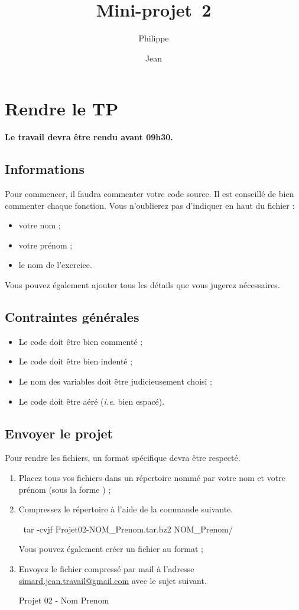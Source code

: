 \documentclass[a4paper]{article}
\title{Mini-projet~2}
\author{Philippe \Nom{Rinaudo}\and{}Jean \Nom{Simard}}
\date{\Date[l]{27}{10}{2009}}
\begin{document}
	\maketitle
	\section{Rendre le TP}
		\textbf{Le travail devra être rendu  avant 09h30.}
		\subsection{Informations}
			Pour commencer, il faudra commenter votre code source.
			Il est conseillé de bien commenter chaque fonction.
			Vous n'oublierez pas d'indiquer en haut du fichier :
			\begin{itemize}
				\item votre nom ;
				\item votre prénom ;
				\item le nom de l'exercice.
			\end{itemize}
			Vous pouvez également ajouter tous les détails que vous jugerez nécessaires.

		\subsection{Contraintes générales}
			\begin{itemize}
				\item Le code doit être bien commenté ;
				\item Le code doit être bien indenté ;
				\item Le nom des variables doit être judicieusement choisi ;
				\item Le code doit être aéré (\emph{i.e.} bien espacé).
			\end{itemize}

		\subsection{Envoyer le projet}
			Pour rendre les fichiers, un format spécifique devra être respecté.
			\begin{enumerate}
				\item Placez tous vos fichiers dans un répertoire nommé par votre nom et votre prénom (sous la forme ) ;
				\item Compressez le répertoire à l'aide de la commande suivante.
				\begin{Code*}
$~$ tar -cvjf Projet02-NOM_Prenom.tar.bz2 NOM_Prenom/
				\end{Code*}
				Vous pouvez également créer un fichier au format  ;
				\item Envoyez le fichier compressé  par mail à l'adresse \href{mailto:simard.jean.travail@gmail.com}{simard.jean.travail@gmail.com} avec le sujet suivant.
				\begin{Code*}
[CCI] Projet 02 - Nom Prenom
				\end{Code*}
			\end{enumerate}
\end{document}
